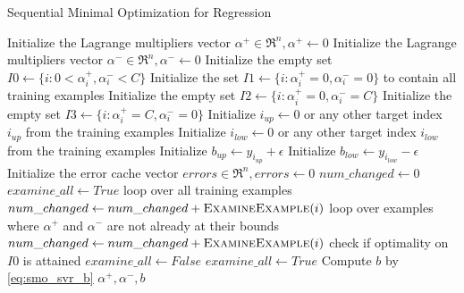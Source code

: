 \begin{breakablealgorithm}
	\caption{Sequential Minimal Optimization for Regression}
	\label{alg:smo_regression}
	\begin{algorithmic}
			\State Initialize the Lagrange multipliers vector $\alpha^+ \in \Re^n, \alpha^+ \gets 0$
			\State Initialize the Lagrange multipliers vector $\alpha^- \in \Re^n, \alpha^- \gets 0$
			\State Initialize the empty set $I0 \gets \{i : 0 < \alpha^+_i, \alpha^-_i < C\}$
			\State Initialize the set $I1 \gets \{i : \alpha^+_i = 0, \alpha^-_i = 0\}$ to contain all training examples
			\State Initialize the empty set $I2 \gets \{i : \alpha^+_i = 0, \alpha^-_i = C\}$
			\State Initialize the empty set $I3 \gets \{i : \alpha^+_i = C, \alpha^-_i = 0\}$
			\State Initialize $i_{up} \gets 0$ \Comment or any other target index $i_{up}$ from the training examples
			\State Initialize $i_{low} \gets 0$ \Comment or any other target index $i_{low}$ from the training examples
			\State Initialize $b_{up} \gets y_{i_{up}} + \epsilon$
			\State Initialize $b_{low} \gets y_{i_{low}} - \epsilon$
			\State Initialize the error cache vector $errors \in \Re^n, errors \gets 0$
				\State $num\_changed \gets 0$
				\State $examine\_all \gets True$
					 \Comment loop over all training examples
						\State $num\_changed \gets num\_changed + \Call{ExamineExample}{i}$
					\EndFor
				\Else
					 \Comment loop over examples where $\alpha^+$ and $\alpha^-$ are not already at their bounds
						\State $num\_changed \gets num\_changed + \Call{ExamineExample}{i}$
						 \Comment check if optimality on $I0$ is attained
							\Break
						\EndIf
					\EndFor
				\EndIf
					\State $examine\_all \gets False$
					\State $examine\_all \gets True$
				\EndIf
			\EndWhile
			\State Compute $b$ by \eqref{eq:smo_svr_b}
			\State \Return $\alpha^+,\alpha^-,b$
		\EndFunction
	\end{algorithmic}
	

\end{breakablealgorithm}
